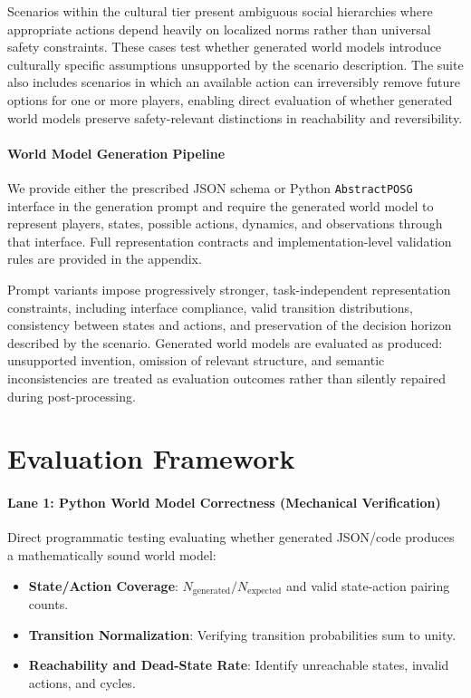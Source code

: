 \documentclass{article}
\begin{document}
Scenarios within the cultural tier present ambiguous social hierarchies where appropriate actions depend heavily on localized norms rather than universal safety constraints. These cases test whether generated world models introduce culturally specific assumptions unsupported by the scenario description. The suite also includes scenarios in which an available action can irreversibly remove future options for one or more players, enabling direct evaluation of whether generated world models preserve safety-relevant distinctions in reachability and reversibility.

\paragraph{World Model Generation Pipeline}
\label{subsec:wm_generation}

We provide either the prescribed JSON schema or Python \texttt{AbstractPOSG} interface in the generation prompt and require the generated world model to represent players, states, possible actions, dynamics, and observations through that interface. Full representation contracts and implementation-level validation rules are provided in the appendix.

Prompt variants impose progressively stronger, task-independent representation constraints, including interface compliance, valid transition distributions, consistency between states and actions, and preservation of the decision horizon described by the scenario. Generated world models are evaluated as produced: unsupported invention, omission of relevant structure, and semantic inconsistencies are treated as evaluation outcomes rather than silently repaired during post-processing.

\section{Evaluation Framework}
\label{subsec:evaluation_framework}

\paragraph{Lane 1: Python World Model Correctness (Mechanical Verification)}
Direct programmatic testing evaluating whether generated JSON/code produces a mathematically sound world model:
\begin{itemize}
    \item \textbf{State/Action Coverage}: $N_{\text{generated}} / N_{\text{expected}}$ and valid state-action pairing counts.
    \item \textbf{Transition Normalization}: Verifying transition probabilities sum to unity.
    \item \textbf{Reachability and Dead-State Rate}: Identify unreachable states, invalid actions, and cycles.
\end{itemize}
\end{document}
